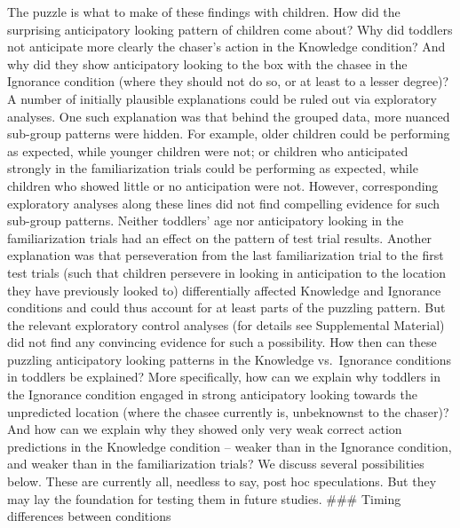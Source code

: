 \documentclass[
  man,floatsintext]{apa6}
\begin{document}
The puzzle is what to make of these findings with children. How did the surprising anticipatory looking pattern of children come about? Why did toddlers not anticipate more clearly the chaser's action in the Knowledge condition? And why did they show anticipatory looking to the box with the chasee in the Ignorance condition (where they should not do so, or at least to a lesser degree)? A number of initially plausible explanations could be ruled out via exploratory analyses. One such explanation was that behind the grouped data, more nuanced sub-group patterns were hidden. For example, older children could be performing as expected, while younger children were not; or children who anticipated strongly in the familiarization trials could be performing as expected, while children who showed little or no anticipation were not. However, corresponding exploratory analyses along these lines did not find compelling evidence for such sub-group patterns. Neither toddlers' age nor anticipatory looking in the familiarization trials had an effect on the pattern of test trial results. Another explanation was that perseveration from the last familiarization trial to the first test trials (such that children persevere in looking in anticipation to the location they have previously looked to) differentially affected Knowledge and Ignorance conditions and could thus account for at least parts of the puzzling pattern. But the relevant exploratory control analyses (for details see Supplemental Material) did not find any convincing evidence for such a possibility.
How then can these puzzling anticipatory looking patterns in the Knowledge vs.~Ignorance conditions in toddlers be explained? More specifically, how can we explain why toddlers in the Ignorance condition engaged in strong anticipatory looking towards the unpredicted location (where the chasee currently is, unbeknownst to the chaser)? And how can we explain why they showed only very weak correct action predictions in the Knowledge condition -- weaker than in the Ignorance condition, and weaker than in the familiarization trials? We discuss several possibilities below. These are currently all, needless to say, post hoc speculations. But they may lay the foundation for testing them in future studies.
\#\#\# Timing differences between conditions
\end{document}

